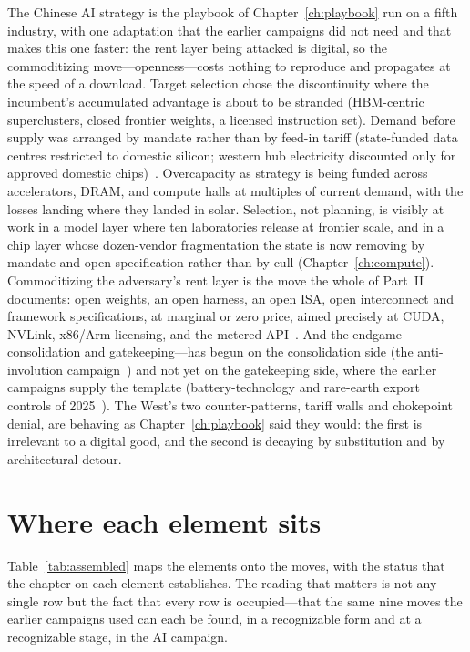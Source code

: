 The Chinese AI strategy is the playbook of Chapter~\ref{ch:playbook} run on a fifth industry, with one adaptation that the earlier campaigns did not need and that makes this one faster: the rent layer being attacked is digital, so the commoditizing move---openness---costs nothing to reproduce and propagates at the speed of a download. Target selection chose the discontinuity where the incumbent's accumulated advantage is about to be stranded (HBM-centric superclusters, closed frontier weights, a licensed instruction set). Demand before supply was arranged by mandate rather than by feed-in tariff (state-funded data centres restricted to domestic silicon; western hub electricity discounted only for approved domestic chips)~\cite{cac-ban,datacenter-mandate}. Overcapacity as strategy is being funded across accelerators, DRAM, and compute halls at multiples of current demand, with the losses landing where they landed in solar. Selection, not planning, is visibly at work in a model layer where ten laboratories release at frontier scale, and in a chip layer whose dozen-vendor fragmentation the state is now removing by mandate and open specification rather than by cull (Chapter~\ref{ch:compute}). Commoditizing the adversary's rent layer is the move the whole of Part~II documents: open weights, an open harness, an open ISA, open interconnect and framework specifications, at marginal or zero price, aimed precisely at CUDA, NVLink, x86/Arm licensing, and the metered API~\cite{action-plan,ai-plus,riscv-policy,huawei-ub}. And the endgame---consolidation and gatekeeping---has begun on the consolidation side (the anti-involution campaign~\cite{anti-involution}) and not yet on the gatekeeping side, where the earlier campaigns supply the template (battery-technology and rare-earth export controls of 2025~\cite{mofcom-battery-controls,csis-rare-earth}). The West's two counter-patterns, tariff walls and chokepoint denial, are behaving as Chapter~\ref{ch:playbook} said they would: the first is irrelevant to a digital good, and the second is decaying by substitution and by architectural detour.

\section{Where each element sits}

Table~\ref{tab:assembled} maps the elements onto the moves, with the status that the chapter on each element establishes. The reading that matters is not any single row but the fact that every row is occupied---that the same nine moves the earlier campaigns used can each be found, in a recognizable form and at a recognizable stage, in the AI campaign.

